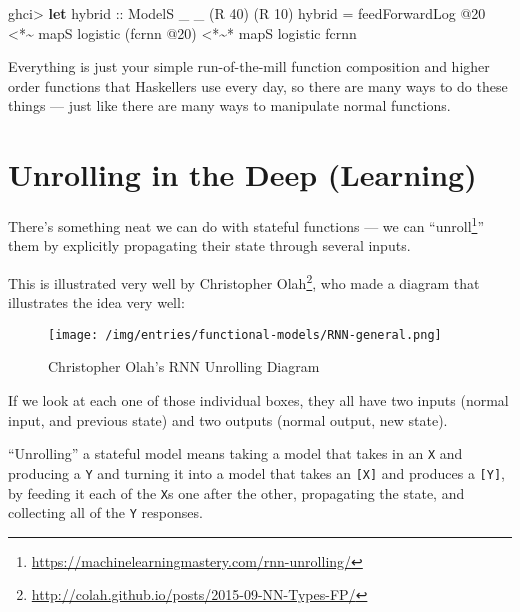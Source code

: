\documentclass[]{article}
\newenvironment{Shaded}{}{}
\newcommand{\DataTypeTok}[1]{\textcolor[rgb]{0.56,0.13,0.00}{#1}}
\newcommand{\DecValTok}[1]{\textcolor[rgb]{0.25,0.63,0.44}{#1}}
\newcommand{\KeywordTok}[1]{\textcolor[rgb]{0.00,0.44,0.13}{\textbf{#1}}}
\newcommand{\NormalTok}[1]{#1}
\newcommand{\OperatorTok}[1]{\textcolor[rgb]{0.40,0.40,0.40}{#1}}
\newcommand{\OtherTok}[1]{\textcolor[rgb]{0.00,0.44,0.13}{#1}}
\renewcommand{\href}[2]{#2\footnote{\url{#1}}}
\begin{document}
\begin{Shaded}
\begin{Highlighting}[]
\NormalTok{ghci}\OperatorTok{>} \KeywordTok{let}\OtherTok{ hybrid ::} \DataTypeTok{ModelS}\NormalTok{ \_ \_ (}\DataTypeTok{R} \DecValTok{40}\NormalTok{) (}\DataTypeTok{R} \DecValTok{10}\NormalTok{)}
\NormalTok{          hybrid }\OtherTok{=}\NormalTok{ feedForwardLog\textquotesingle{} }\OperatorTok{@}\DecValTok{20}
              \OperatorTok{<*\textasciitilde{}}\NormalTok{  mapS logistic (fcrnn }\OperatorTok{@}\DecValTok{20}\NormalTok{)}
              \OperatorTok{<*\textasciitilde{}*}\NormalTok{ mapS logistic fcrnn}
\end{Highlighting}
\end{Shaded}

Everything is just your simple run-of-the-mill function composition and higher
order functions that Haskellers use every day, so there are many ways to do
these things --- just like there are many ways to manipulate normal functions.

\hypertarget{unrolling-in-the-deep-learning}{%
\section{Unrolling in the Deep
(Learning)}\label{unrolling-in-the-deep-learning}}

There's something neat we can do with stateful functions --- we can
``\href{https://machinelearningmastery.com/rnn-unrolling/}{unroll}'' them by
explicitly propagating their state through several inputs.

This is illustrated very well by
\href{http://colah.github.io/posts/2015-09-NN-Types-FP/}{Christopher Olah}, who
made a diagram that illustrates the idea very well:

\begin{figure}
\centering
\texttt{[image: /img/entries/functional-models/RNN-general.png]}
\caption{Christopher Olah's RNN Unrolling Diagram}
\end{figure}

If we look at each one of those individual boxes, they all have two inputs
(normal input, and previous state) and two outputs (normal output, new state).

``Unrolling'' a stateful model means taking a model that takes in an \texttt{X}
and producing a \texttt{Y} and turning it into a model that takes an
\texttt{{[}X{]}} and produces a \texttt{{[}Y{]}}, by feeding it each of the
\texttt{X}s one after the other, propagating the state, and collecting all of
the \texttt{Y} responses.
\end{document}
